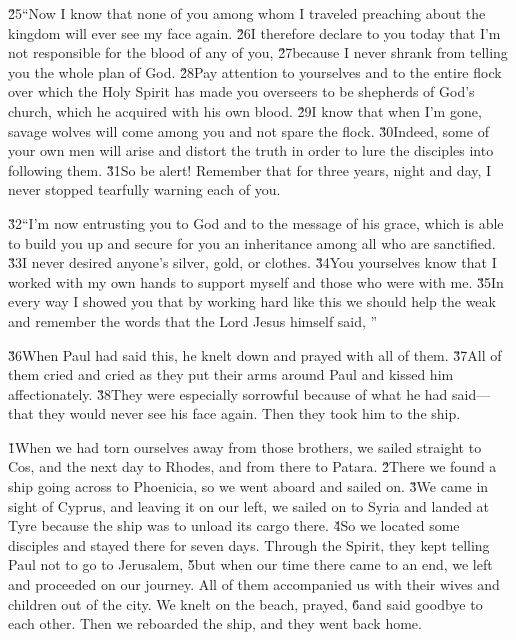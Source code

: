 \v{25}``Now I know that none of you among whom I traveled preaching about the kingdom will ever see my face again. \v{26}I therefore declare to you today that I'm not responsible for the blood of any of you, \v{27}because I never shrank from telling you the whole plan of God. \v{28}Pay attention to yourselves and to the entire flock over which the Holy Spirit has made you overseers to be shepherds of God's church, which he acquired with his own blood. \v{29}I know that when I'm gone, savage wolves will come among you and not spare the flock. \v{30}Indeed, some of your own men will arise and distort the truth in order to lure the disciples into following them. \v{31}So be alert! Remember that for three years, night and day, I never stopped tearfully warning each of you.

\v{32}``I'm now entrusting you to God and to the message of his grace, which is able to build you up and secure for you an inheritance among all who are sanctified. \v{33}I never desired anyone's silver, gold, or clothes. \v{34}You yourselves know that I worked with my own hands to support myself and those who were with me. \v{35}In every way I showed you that by working hard like this we should help the weak and remember the words that the Lord Jesus himself said, ''

\v{36}When Paul had said this, he knelt down and prayed with all of them. \v{37}All of them cried and cried as they put their arms around Paul and kissed him affectionately. \v{38}They were especially sorrowful because of what he had said---that they would never see his face again. Then they took him to the ship.

\v{1}When we had torn ourselves away from those brothers, we sailed straight to Cos, and the next day to Rhodes, and from there to Patara. \v{2}There we found a ship going across to Phoenicia, so we went aboard and sailed on. \v{3}We came in sight of Cyprus, and leaving it on our left, we sailed on to Syria and landed at Tyre because the ship was to unload its cargo there. \v{4}So we located some disciples and stayed there for seven days. Through the Spirit, they kept telling Paul not to go to Jerusalem, \v{5}but when our time there came to an end, we left and proceeded on our journey. All of them accompanied us with their wives and children out of the city. We knelt on the beach, prayed, \v{6}and said goodbye to each other. Then we reboarded the ship, and they went back home.

